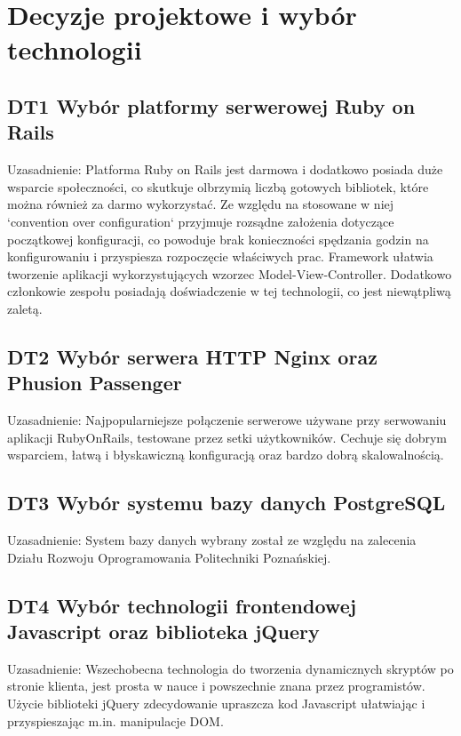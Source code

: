 \section{Decyzje projektowe i wybór technologii}

\subsection{DT1 Wybór platformy serwerowej Ruby on Rails}

Uzasadnienie: Platforma Ruby on Rails jest darmowa i dodatkowo posiada duże wsparcie społeczności, co skutkuje olbrzymią liczbą gotowych bibliotek, które można również za darmo wykorzystać. Ze względu na stosowane w niej `convention over configuration` przyjmuje rozsądne założenia dotyczące początkowej konfiguracji, co powoduje brak konieczności spędzania godzin na konfigurowaniu i przyspiesza rozpoczęcie właściwych prac. Framework ułatwia tworzenie aplikacji wykorzystujących wzorzec Model-View-Controller. Dodatkowo członkowie zespołu posiadają doświadczenie w tej technologii, co jest niewątpliwą zaletą.

\subsection{DT2 Wybór serwera HTTP Nginx oraz Phusion Passenger}

Uzasadnienie: Najpopularniejsze połączenie serwerowe używane przy serwowaniu aplikacji RubyOnRails, testowane przez setki użytkowników. Cechuje się dobrym wsparciem, łatwą i błyskawiczną konfiguracją oraz bardzo dobrą skalowalnością.

\subsection{DT3 Wybór systemu bazy danych PostgreSQL}

Uzasadnienie: System bazy danych wybrany został ze względu na zalecenia Działu Rozwoju Oprogramowania Politechniki Poznańskiej.

\subsection{DT4 Wybór technologii frontendowej Javascript oraz biblioteka jQuery}

Uzasadnienie: Wszechobecna technologia do tworzenia dynamicznych skryptów po stronie klienta, jest prosta w nauce i powszechnie znana przez programistów. Użycie biblioteki jQuery zdecydowanie upraszcza kod Javascript ułatwiając i przyspieszając m.in. manipulacje DOM.

